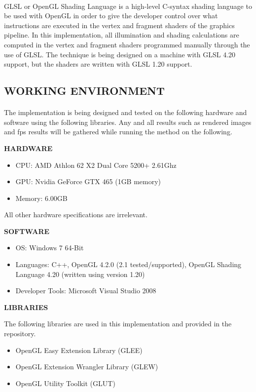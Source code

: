 \paragraph{}
GLSL or OpenGL Shading Language is a high-level C-syntax shading language to be used with OpenGL in order to give the developer control over what instructions are executed in the vertex and fragment shaders of the graphics pipeline.  In this implementation, all illumination and shading calculations are computed in the vertex and fragment shaders programmed manually through the use of GLSL.  The technique is being designed on a machine with GLSL 4.20 support, but the shaders are written with GLSL 1.20 support.

\subsection{WORKING ENVIRONMENT}
\paragraph{}
The implementation is being designed and tested on the following hardware and software using the following libraries.  Any and all results such as rendered images and fps results will be gathered while running the method on the following.

\vspace{10 mm}

\textbf{HARDWARE}
\begin{itemize}
\item CPU: AMD Athlon 62 X2 Dual Core 5200+ 2.61Ghz
\item GPU: Nvidia GeForce GTX 465 (1GB memory)
\item Memory: 6.00GB
\end{itemize}

All other hardware specifications are irrelevant.

\vspace{10 mm}

\textbf{SOFTWARE}
\begin{itemize}
\item OS: Windows 7 64-Bit
\item Languages: C++, OpenGL 4.2.0 (2.1 tested/supported), OpenGL Shading Language 4.20 (written using version 1.20)
\item Developer Tools: Microsoft Visual Studio 2008
\end{itemize}

\vspace{10 mm}

\textbf{LIBRARIES}

\vspace{1 mm}

The following libraries are used in this implementation and provided in the repository.

\begin{itemize}
\item OpenGL Easy Extension Library (GLEE)
\item OpenGL Extension Wrangler Library (GLEW)
\item OpenGL Utility Toolkit (GLUT)
\end{itemize}

